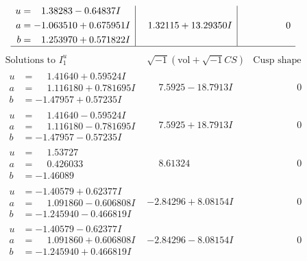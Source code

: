 \documentclass[1p]{elsarticle_modified}
\theoremstyle{definition}
\newcommand{\I}{\sqrt{-1}}
\begin{document}
$$\begin{array}{c|c|c}
\begin{aligned}
u &= \phantom{-}1.38283 - 0.64837 I \\
a &= -1.063510 + 0.675951 I \\
b &= \phantom{-}1.253970 + 0.571822 I\end{aligned}
 & \phantom{-}1.32115 + 13.29350 I & \phantom{-0.000000 } 0\\
 \hline 
 \end{array}$$\newpage$$\begin{array}{c|c|c}  
\text{Solutions to }I^u_{1}& \I (\text{vol} + \sqrt{-1}CS) & \text{Cusp shape}\\
 \hline 
\begin{aligned}
u &= \phantom{-}1.41640 + 0.59524 I \\
a &= \phantom{-}1.116180 + 0.781695 I \\
b &= -1.47957 + 0.57235 I\end{aligned}
 & \phantom{-}7.5925 - 18.7913 I & \phantom{-0.000000 } 0 \\ \hline\begin{aligned}
u &= \phantom{-}1.41640 - 0.59524 I \\
a &= \phantom{-}1.116180 - 0.781695 I \\
b &= -1.47957 - 0.57235 I\end{aligned}
 & \phantom{-}7.5925 + 18.7913 I & \phantom{-0.000000 } 0 \\ \hline\begin{aligned}
u &= \phantom{-}1.53727\phantom{ +0.000000I} \\
a &= \phantom{-}0.426033\phantom{ +0.000000I} \\
b &= -1.46089\phantom{ +0.000000I}\end{aligned}
 & \phantom{-}8.61324\phantom{ +0.000000I} & \phantom{-0.000000 } 0 \\ \hline\begin{aligned}
u &= -1.40579 + 0.62377 I \\
a &= \phantom{-}1.091860 - 0.606808 I \\
b &= -1.245940 - 0.466819 I\end{aligned}
 & -2.84296 + 8.08154 I & \phantom{-0.000000 } 0 \\ \hline\begin{aligned}
u &= -1.40579 - 0.62377 I \\
a &= \phantom{-}1.091860 + 0.606808 I \\
b &= -1.245940 + 0.466819 I\end{aligned}
 & -2.84296 - 8.08154 I & \phantom{-0.000000 } 0 \\ \hline\begin{aligned}

\end{aligned}
\end{array}$$
\end{document}
